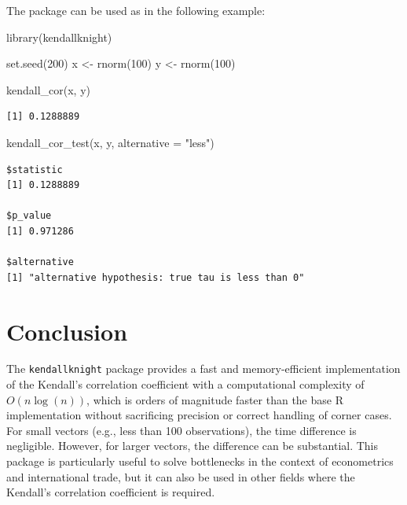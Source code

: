 \documentclass[12pt]{article}
\newenvironment{Shaded}{\begin{snugshade}}{\end{snugshade}}
\newcommand{\AttributeTok}[1]{\textcolor[rgb]{0.40,0.45,0.13}{#1}}
\newcommand{\DecValTok}[1]{\textcolor[rgb]{0.68,0.00,0.00}{#1}}
\newcommand{\FunctionTok}[1]{\textcolor[rgb]{0.28,0.35,0.67}{#1}}
\newcommand{\NormalTok}[1]{\textcolor[rgb]{0.00,0.23,0.31}{#1}}
\newcommand{\OtherTok}[1]{\textcolor[rgb]{0.00,0.23,0.31}{#1}}
\newcommand{\StringTok}[1]{\textcolor[rgb]{0.13,0.47,0.30}{#1}}
\begin{document}
The package can be used as in the following example:

\begin{Shaded}
\begin{Highlighting}[]
\FunctionTok{library}\NormalTok{(kendallknight)}

\FunctionTok{set.seed}\NormalTok{(}\DecValTok{200}\NormalTok{)}
\NormalTok{x }\OtherTok{\textless{}{-}} \FunctionTok{rnorm}\NormalTok{(}\DecValTok{100}\NormalTok{)}
\NormalTok{y }\OtherTok{\textless{}{-}} \FunctionTok{rnorm}\NormalTok{(}\DecValTok{100}\NormalTok{)}

\FunctionTok{kendall\_cor}\NormalTok{(x, y)}
\end{Highlighting}
\end{Shaded}

\begin{verbatim}
[1] 0.1288889
\end{verbatim}

\begin{Shaded}
\begin{Highlighting}[]
\FunctionTok{kendall\_cor\_test}\NormalTok{(x, y, }\AttributeTok{alternative =} \StringTok{"less"}\NormalTok{)}
\end{Highlighting}
\end{Shaded}

\begin{verbatim}
$statistic
[1] 0.1288889

$p_value
[1] 0.971286

$alternative
[1] "alternative hypothesis: true tau is less than 0"
\end{verbatim}

\section{Conclusion}\label{conclusion}

The \texttt{kendallknight} package provides a fast and memory-efficient
implementation of the Kendall's correlation coefficient with a
computational complexity of \(O(n \log(n))\), which is orders of
magnitude faster than the base R implementation without sacrificing
precision or correct handling of corner cases. For small vectors (e.g.,
less than 100 observations), the time difference is negligible. However,
for larger vectors, the difference can be substantial. This package is
particularly useful to solve bottlenecks in the context of econometrics
and international trade, but it can also be used in other fields where
the Kendall's correlation coefficient is required.
\end{document}
